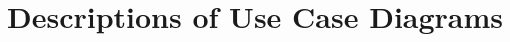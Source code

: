 \documentclass[12pt]{report}
\begin{document}
\section{Descriptions of Use Case Diagrams}
\end{document}
